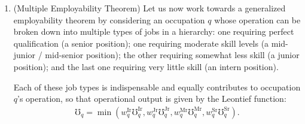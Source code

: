 \documentclass[hidelinks, nonatbib]{elsarticle}
\begin{document}
\begin{enumerate}
\begin{align}
{                1
            }{
                \int_{0}^{\tilde{Y}_{q}^{\text{Jr}}}
                    \text{ta}_q(l)
                    dl
            }
            -
            \frac{
                \int_{0}^{\tilde{Y}_{q}^{\text{Jr}}}
                    \text{ta}_q(l)
                    dl
            }{
                \int_{0}^{\tilde{Y}_{q}^{\text{Jr}}}
                    \text{ta}_q(l)
                    dl
            }
        \right) ^ {-1}
        \\&=
        \left(
            1 + 
            \frac{
                1
            }{
                \int_{0}^{\tilde{Y}_{q}^{\text{Jr}}}
                    \text{ta}_q(l)
                    dl
            }
            -
            1
        \right) ^ {-1}
        \\&=
        \left(
            \frac{
                1
            }{
                \int_{0}^{\tilde{Y}_{q}^{\text{Jr}}}
                    \text{ta}_q(l)
                    dl
            }
        \right) ^ {-1}
        \\&=
        \int_{0}^{\tilde{Y}_{q}^{\text{Jr}}}
            \text{ta}_q(l)
            dl
        .
    \end{align}

    thus, the employability of a partially qualified worker, that is a ``junior'', is precisely the percentage of an operation's total time duration their skill set allows them to accomplish (i.e. the inverse of their operational output).
    \item (Multiple Employability Theorem) Let us now work towards a generalized employability theorem by considering an occupation $q$ whose operation can be broken down into multiple types of jobs in a hierarchy: one requiring perfect qualification (a senior position); one requiring moderate skill levels (a mid-junior / mid-senior position); the other requiring somewhat less skill (a junior position); and the last one requiring very little skill (an intern position).
    
    Each of these job types is indispensable and equally contributes to occupation $q$'s operation, so that operational output is given by the Leontief function:
    \begin{gather}
        \mho_{q} = 
        \min
        \left(
            w_{q}^{\text{Ir}} \mho_{q}^{\text{Ir}},
            w_{q}^{\text{Jr}} \mho_{q}^{\text{Jr}},
            w_{q}^{\text{Mr}} \mho_{q}^{\text{Mr}},
            w_{q}^{\text{Sr}} \mho_{q}^{\text{Sr}}    
        \right)
        .
    \end{gather}


\end{enumerate}
\end{document}

